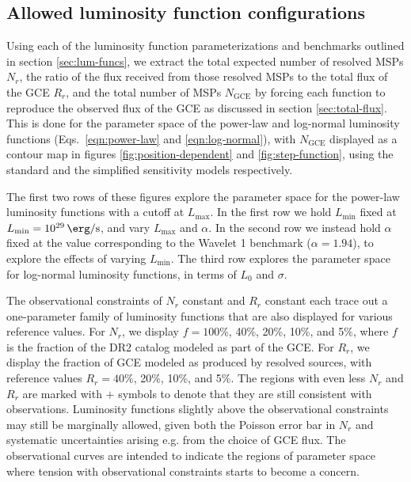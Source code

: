 \documentclass[letter,11pt]{article}
\begin{document}
\subsection{Allowed luminosity function configurations}
\label{sec:allowed-configurations}
Using each of the luminosity function parameterizations and benchmarks outlined in section \ref{sec:lum-funcs}, we extract the total expected number of resolved MSPs $N_r$, the ratio of the flux received from those resolved MSPs to the total flux of the GCE $R_r$, and the total number of MSPs $N_\text{GCE}$ by forcing each function to reproduce the observed flux of the GCE as discussed in section \ref{sec:total-flux}. This is done for the parameter space of the power-law and log-normal luminosity functions (Eqs.~\ref{eqn:power-law} and \ref{eqn:log-normal}), with $N_\text{GCE}$ displayed as a contour map in figures \ref{fig:position-dependent} and \ref{fig:step-function}, using the standard and the simplified sensitivity models respectively.

The first two rows of these figures explore the parameter space for the power-law luminosity functions with a cutoff at $L_\text{max}$. In the first row we hold $L_\text{min}$ fixed at $L_\text{min}=\SI{e29}{\erg\per\second}$, and vary $L_\text{max}$ and $\alpha$. In the second row we instead hold $\alpha$ fixed at the value corresponding to the Wavelet 1 benchmark ($\alpha=1.94$), to explore the effects of varying $L_\text{min}$. The third row explores the parameter space for log-normal luminosity functions, in terms of $L_0$ and $\sigma$.

The observational constraints of $N_r$ constant and $R_r$ constant each trace out a one-parameter family of luminosity functions that are also displayed for various reference values. For $N_r$, we display $f=100\%$, 40\%, 20\%, 10\%, and 5\%, where $f$ is the fraction of the DR2 catalog modeled as part of the GCE. For $R_r$, we display the fraction of GCE modeled as produced by resolved sources, with reference values $R_r=40\%$, 20\%, 10\%, and 5\%. The regions with even less $N_r$ and $R_r$ are marked with $+$ symbols to denote that they are still consistent with observations. Luminosity functions slightly above the observational constraints may still be marginally allowed, given both the Poisson error bar in $N_r$ and systematic uncertainties arising e.g. from the choice of GCE flux. The observational curves are intended to indicate the regions of parameter space where tension with observational constraints starts to become a concern.
\end{document}
